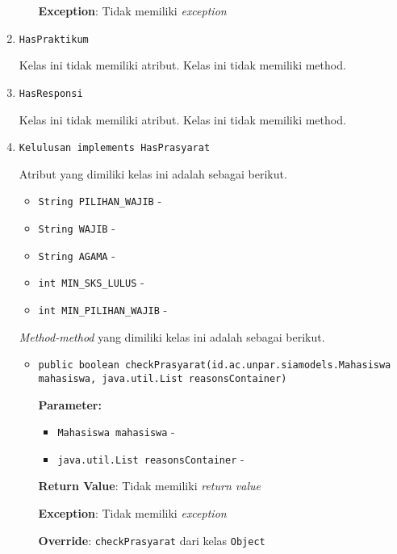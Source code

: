 \documentclass{article}
\begin{document}
\begin{enumerate}
\begin{itemize}
\textbf{Exception}: Tidak memiliki \textit{exception}

\end{itemize}
\item \texttt{HasPraktikum}



Kelas ini tidak memiliki atribut. Kelas ini tidak memiliki method. \item \texttt{HasResponsi}



Kelas ini tidak memiliki atribut. Kelas ini tidak memiliki method. \item \texttt{Kelulusan implements HasPrasyarat}



Atribut yang dimiliki kelas ini adalah sebagai berikut.
\begin{itemize}
\item \texttt{String PILIHAN\_WAJIB} - 
\item \texttt{String WAJIB} - 
\item \texttt{String AGAMA} - 
\item \texttt{int MIN\_SKS\_LULUS} - 
\item \texttt{int MIN\_PILIHAN\_WAJIB} - 
\end{itemize}
\textit{Method-method} yang dimiliki kelas ini adalah sebagai berikut.
\begin{itemize}
\item \texttt{public boolean checkPrasyarat(id.ac.unpar.siamodels.Mahasiswa mahasiswa, java.util.List reasonsContainer)}

\textbf{Parameter:}
\begin{itemize}
\item \texttt{Mahasiswa mahasiswa} - 
\item \texttt{java.util.List reasonsContainer} - 
\end{itemize}
\textbf{Return Value}: Tidak memiliki \textit{return value}

\textbf{Exception}: Tidak memiliki \textit{exception}

\textbf{Override}: \texttt{checkPrasyarat} dari kelas \texttt{Object}

\end{itemize}
\end{enumerate}
\end{document}
